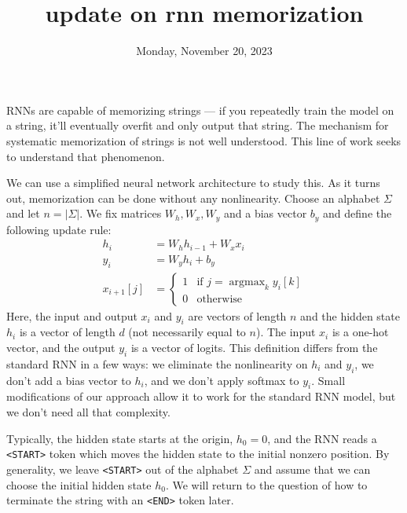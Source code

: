 

\title{update on rnn memorization}
\date{\vspace{-1em}Monday, November 20, 2023\vspace{1em}}
\author{}

\DeclareMathOperator{\argmax}{argmax}


\maketitle

RNNs are capable of memorizing strings — if you repeatedly train the model on a string, it'll eventually overfit and only output that string. The mechanism for systematic memorization of strings is not well understood. This line of work seeks to understand that phenomenon.

We can use a simplified neural network architecture to study this. As it turns out, memorization can be done without any nonlinearity. Choose an alphabet $\Sigma$ and let $n = |\Sigma|$. We fix matrices $W_h, W_x, W_y$ and a bias vector $b_y$ and define the following update rule:
\begin{align*}
    h_i &= W_h h_{i-1} + W_x x_i \\
    y_i &= W_y h_i + b_y \\
    x_{i + 1}[j] &= \begin{cases}
        1 & \text{if } j = \argmax_k y_i[k] \\
        0 & \text{otherwise}
    \end{cases}
\end{align*}
Here, the input and output $x_i$ and $y_i$ are vectors of length $n$ and the hidden state $h_i$ is a vector of length $d$ (not necessarily equal to $n$). The input $x_i$ is a one-hot vector, and the output $y_i$ is a vector of logits. This definition differs from the standard RNN in a few ways: we eliminate the nonlinearity on $h_i$ and $y_i$, we don't add a bias vector to $h_i$, and we don't apply softmax to $y_i$. Small modifications of our approach allow it to work for the standard RNN model, but we don't need all that complexity.

Typically, the hidden state starts at the origin, $h_0 = 0$, and the RNN reads a \verb|<START>| token which moves the hidden state to the initial nonzero position. By generality, we leave \verb|<START>| out of the alphabet $\Sigma$ and assume that we can choose the initial hidden state $h_0$. We will return to the question of how to terminate the string with an \verb|<END>| token later.

